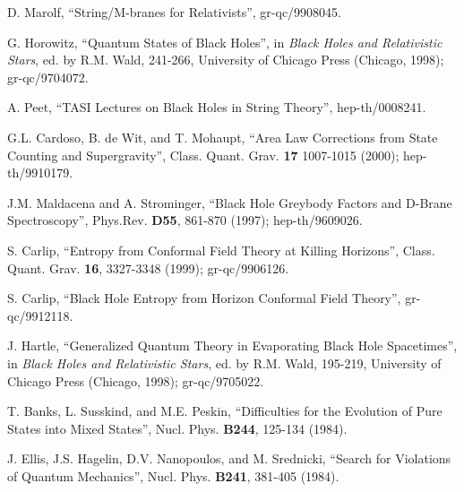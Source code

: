 \begin{thebibliography}{999}
 D. Marolf, ``String/M-branes for
Relativists'', gr-qc/9908045.  

 G. Horowitz, ``Quantum States of Black
Holes'', in {\it Black Holes and Relativistic Stars}, ed. by
R.M. Wald, 241-266, University of Chicago Press (Chicago, 1998);
gr-qc/9704072.  

 A. Peet, ``TASI Lectures on Black Holes
in String Theory'', hep-th/0008241. 

 G.L. Cardoso, B. de Wit, and T. Mohaupt,
``Area Law Corrections from State Counting and Supergravity'',
Class. Quant. Grav. {\bf 17} 1007-1015 (2000); hep-th/9910179.

 J.M. Maldacena and A. Strominger,
``Black Hole Greybody Factors and D-Brane Spectroscopy'',
Phys.Rev. {\bf D55}, 861-870 (1997); hep-th/9609026.  

 S. Carlip, ``Entropy from Conformal
Field Theory at Killing Horizons'', Class. Quant. Grav. {\bf 16},
3327-3348 (1999); gr-qc/9906126.  

 S. Carlip, ``Black Hole Entropy from
Horizon Conformal Field Theory'', gr-qc/9912118.  

 J. Hartle, ``Generalized Quantum Theory
in Evaporating Black Hole Spacetimes'', in {\it Black Holes and
Relativistic Stars}, ed. by R.M. Wald, 195-219, University of Chicago
Press (Chicago, 1998); gr-qc/9705022. 

 T. Banks, L. Susskind, and M.E. Peskin,
``Difficulties for the Evolution of Pure States into Mixed States'',
Nucl. Phys. {\bf B244}, 125-134 (1984).  

 J. Ellis, J.S. Hagelin,
D.V. Nanopoulos, and M. Srednicki, ``Search for Violations of Quantum
Mechanics'', Nucl. Phys. {\bf B241}, 381-405 (1984).  


\end{thebibliography}
